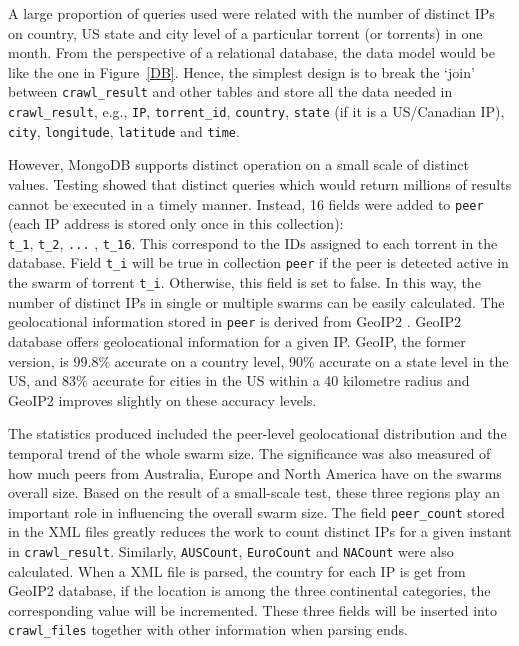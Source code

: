 \documentclass[conference]{IEEEtran}
\begin{document}
A large proportion of queries used were related with the number of distinct IPs on country, US state and city level of a particular torrent (or torrents) in one month. From the perspective of a relational database, the data model would be like the one in Figure~\ref{DB}. Hence, the simplest design is to break the `join' between \texttt{crawl\_result} and other tables and store all the data needed in \texttt{crawl\_result}, e.g., \texttt{IP}, \texttt{torrent\_id}, \texttt{country}, \texttt{state} (if it is a US/Canadian IP), \texttt{city}, \texttt{longitude}, \texttt{latitude} and \texttt{time}. 

However, MongoDB supports distinct operation on a small scale of distinct values. Testing showed that distinct queries which would return millions of results cannot be executed in a timely manner. Instead, 16 fields were added to \texttt{peer} (each IP address is stored only once in this collection): \\\texttt{t\_1}, \texttt{t\_2}, \texttt{...} , \texttt{t\_16}. This correspond to the IDs assigned to each torrent in the database. Field \texttt{t\_i} will be true in collection \texttt{peer} if the peer is detected active in the swarm of torrent \texttt{t\_i}. Otherwise, this field is set to false. In this way, the number of distinct IPs in single or multiple swarms can be easily calculated. The geolocational information stored in \texttt{peer} is derived from GeoIP2 \cite{maxmind}. GeoIP2 database offers geolocational information for a given IP. GeoIP, the former version, is 99.8\% accurate on a country level, 90\% accurate on a state level in the US, and 83\% accurate for cities in the US within a 40 kilometre radius and GeoIP2 improves slightly on these accuracy levels.

The statistics produced included the peer-level geolocational distribution and the temporal trend of the whole swarm size. The significance was also measured of how much peers from Australia, Europe and North America have on the swarms overall size. Based on the result of a small-scale test, these three regions play an important role in influencing the overall swarm size. The field \texttt{peer\_count} stored in the XML files greatly reduces the work to count distinct IPs for a given instant in \texttt{crawl\_result}. Similarly, \texttt{AUSCount}, \texttt{EuroCount} and \texttt{NACount} were also calculated. When a XML file is parsed, the country for each IP is get from GeoIP2 database, if the location is among the three continental categories, the corresponding value will be incremented. These three fields will be inserted into \texttt{crawl\_files} together with other information when parsing ends.
\end{document}
